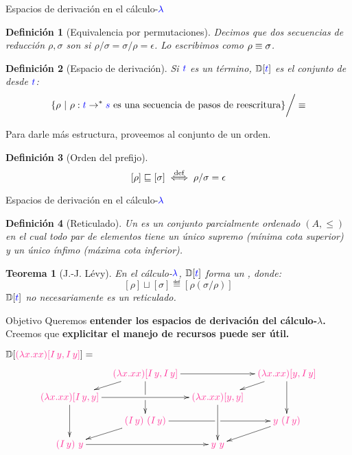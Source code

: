 \documentclass{beamer}
\newtheorem{defes}{Definición}
\newtheorem{teoes}{Teorema}
\newcommand{\cLam}[1]{{\color{darkBlue} #1}}
\newcommand{\cProto}[1]{{\color{lightBlue} #1}}
\newcommand{\clambda}{\cLam{\lambda}}
\begin{document}
\begin{frame}{Espacios de derivación en el cálculo-$\clambda$}

\begin{defes}[Equivalencia por permutaciones]
  Decimos que dos secuencias de reducción $\rho, \sigma$ son  si $\rho/\sigma = \sigma/\rho = \epsilon$.
Lo escribimos como $\rho \equiv \sigma$.
\end{defes}

\begin{defes}[Espacio de derivación]
Si $\cLam{\tm}$ es un término, $\ulbDeriv{\cLam{\tm}}$ es el conjunto de
 desde $\cLam{\tm}$:
\[
  \set{\rho \ | \ \rho : \cLam{t} \to^* \cLam{s} \text{ es una secuencia de pasos de reescritura}} \bigg/ \permeq
\]
\end{defes}

Para darle más estructura, proveemos al conjunto de un orden.

\begin{defes}[Orden del prefijo]
\[[\rho] \sqsubseteq [\sigma]   \overset{\mathrm{def}}{\iff} \rho / \sigma = \epsilon\]
\end{defes}
\end{frame}

\begin{frame}{Espacios de derivación en el cálculo-$\clambda$}

\begin{defes}[Reticulado]
  Un  es un conjunto parcialmente ordenado $(A, \leq)$ en el cual
todo par de elementos tiene un único supremo (mínima cota superior)
y un único ínfimo (máxima cota inferior).
\end{defes}

\vskip 0.5cm

\begin{teoes}[J.-J. Lévy]
En el cálculo-$\clambda$, $\ulbDeriv{\cLam{t}}$ forma un ,
donde:
\[[\rho] \sqcup [\sigma] \eqdef [\rho (\sigma / \rho)] \]
\noindent $\ulbDeriv{\cLam{t}}$ no necesariamente es un reticulado.
\end{teoes}

\end{frame}


\begin{frame}{Objetivo}
Queremos \textbf{entender los espacios de derivación del cálculo-$\lambda$.}
\vskip 0.2cm
Creemos que \textbf{explicitar el manejo de recursos puede ser útil.}
\vskip 0.5cm

$\ulbDeriv{\cProto{(\lam{x}{x x}) [I\, y, I\, y]}} = $
\[\xymatrix@=0.3cm{
& \cProto{(\lam{x}{x x}) [I\, y, I\, y]} \ar[rr] \ar[dd]|!{[d]}\hole \ar[dl]
& & \cProto{(\lam{x}{x x}) [y, I\, y]} \ar[dd] \ar[dl]
\\
\cProto{(\lam{x}{x x}) [I\, y, y]} \ar[rr]\ar[dd]
& & \cProto{(\lam{x}{x x}) [y, y]} \ar[dd]
\\
& \cProto{(I\, y)\ (I\, y)} \ar[rr]|!{[r]}\hole \ar[dl]
& & \cProto{y\ (I\, y)} \ar[dl]
\\
\cProto{(I\, y)\ y} \ar[rr]
& & \cProto{y\ y}
}\]
\end{frame}
\end{document}
